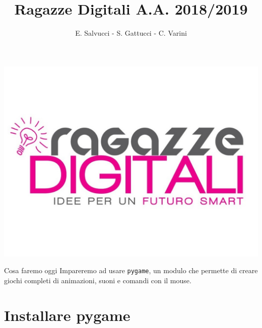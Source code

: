 \documentclass{beamer}
\title[Ragazze Digitali 2019]{Ragazze Digitali A.A. 2018/2019}
\author{E. Salvucci - S. Gattucci - C. Varini}
\date{}
\begin{document}
{\includegraphics[width=\paperwidth,height=\paperheight]{images/ragazze_digitali.jpg}}
\begin{frame}
\end{frame}


\begin{frame}{Cosa faremo oggi}
    \vspace{0.8cm}
      Impareremo ad usare \texttt{pygame}, un modulo che permette di creare giochi completi di animazioni, suoni e comandi con il mouse.
\end{frame}

\section{Installare pygame}
\end{document}
